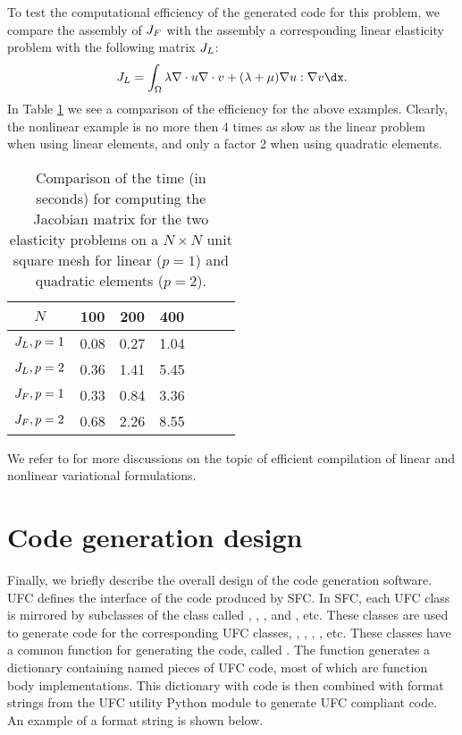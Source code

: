 To test the computational efficiency of the generated code for this
problem, we compare the assembly of $J_F$ with the assembly a
corresponding linear elasticity problem with the following matrix $J_L$:
\begin{equation}
\JJ_L = \int_\Omega \lambda \nabla \cdot u \nabla \cdot v + (\lambda + \mu)\nabla u:\nabla v \dx.
\end{equation}
In Table \ref{SFCtest} we see a comparison of the efficiency for the
above examples.  Clearly, the nonlinear example is no more then 4 times
as slow as the linear problem when using linear elements, and only a
factor 2 when using quadratic elements.
\begin{table}
\begin{center}
\begin{tabular}{|c|c|c|c|c|c|c|} \hline
$N$              & 100   & 200  & 400    \\ \hline
$J_L, p=1$     & 0.08  & 0.27  & 1.04     \\ \hline
$J_L, p=2$     & 0.36  & 1.41  & 5.45      \\ \hline
$J_F, p=1$     & 0.33  & 0.84  & 3.36     \\ \hline
$J_F, p=2$     & 0.68  & 2.26  & 8.55     \\ \hline
\end{tabular}
\caption{Comparison of the time (in seconds) for computing the Jacobian
matrix for the two elasticity problems on a $N\times N$ unit square mesh
for linear ($p=1$) and quadratic elements ($p=2$).}
\label{SFCtest}
\end{center}
\end{table}

We refer to
\citet{AlnaesMardal2009b,OelgaardLoggWells2008,KirbyLogg2008,OelgaardWells2010}
for more discussions on the topic of efficient compilation of linear
and nonlinear variational formulations.

\section{Code generation design}

Finally, we briefly describe the overall design of the code
generation software.  UFC defines the interface of the code produced
by SFC.  In SFC, each UFC class is mirrored by subclasses of the
class  called , ,
, and , etc.  These classes
are used to generate code for the corresponding UFC classes, ,
, , , etc. These
classes have a common function for generating the code, called
.  The function 
generates a dictionary containing named pieces of UFC code, most of
which are function body implementations.  This dictionary with code is
then combined with format strings from the UFC utility Python module
to generate UFC compliant code.  An example of a format string is
shown below.

